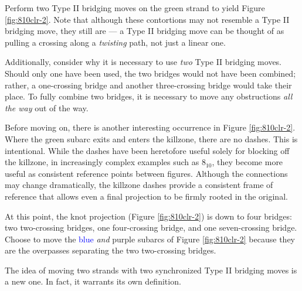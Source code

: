 \documentclass[titlepage,11pt]{article}
\begin{document}
Perform two Type II bridging moves on the \textcolor{grx}{green} strand to yield Figure \ref{fig:810clr-2}. Note that although these contortions may not resemble a Type II bridging move, they still are --- a Type II bridging move can be thought of as pulling a crossing along a \emph{twisting} path, not just a linear one.\par
Additionally, consider why it is necessary to use \emph{two} Type II bridging moves. Should only one have been used, the two bridges would not have been combined; rather, a one-crossing bridge and another three-crossing bridge would take their place. To fully combine two bridges, it is necessary to move any obstructions \emph{all the way} out of the way.\par
Before moving on, there is another interesting occurrence in Figure \ref{fig:810clr-2}. Where the \textcolor{grx}{green} subarc exits and enters the killzone, there are no dashes. This is intentional. While the dashes have been heretofore useful solely for blocking off the killzone, in increasingly complex examples such as $8_{10}$, they become more useful as consistent reference points between figures. Although the connections may change dramatically, the killzone dashes provide a consistent frame of reference that allows even a final projection to be firmly rooted in the original.\par
At this point, the knot projection (Figure \ref{fig:810clr-2}) is down to four bridges: two two-crossing bridges, one four-crossing bridge, and one seven-crossing bridge. Choose to move the \textcolor{blue}{blue} \emph{and} \textcolor{pux}{purple} subarcs of Figure \ref{fig:810clr-2} because they are the overpasses separating the two two-crossing bridges.\par
The idea of moving two strands with two synchronized Type II bridging moves is a new one. In fact, it warrants its own definition.\par
\end{document}
